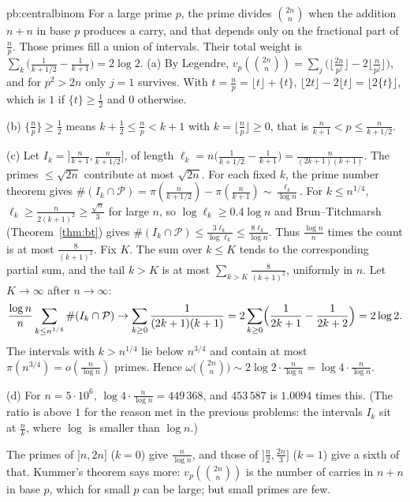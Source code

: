 \begin{solution}{pb:centralbinom}
\idea For a large prime $p$, the prime divides $\binom{2n}n$ when the addition $n+n$ in base $p$ produces a carry, and that depends only on the fractional part of $\frac np$. Those primes fill a union of intervals. Their total weight is $\sum_k\bigl(\frac1{k+1/2}-\frac1{k+1}\bigr)=2\log2$.
\writeup (a) By Legendre, $v_p(\binom{2n}n)=\sum_j\bigl(\lfloor\frac{2n}{p^j}\rfloor-2\lfloor\frac n{p^j}\rfloor\bigr)$, and for $p^2>2n$ only $j=1$ survives. With $t=\frac np=\lfloor t\rfloor+\{t\}$,
$\lfloor2t\rfloor-2\lfloor t\rfloor=\lfloor2\{t\}\rfloor$, which is $1$ if $\{t\}\ge\frac12$ and $0$ otherwise.

(b) $\{\frac np\}\ge\frac12$ means $k+\frac12\le\frac np<k+1$ with $k=\lfloor\frac np\rfloor\ge0$, that is $\frac n{k+1}<p\le\frac n{k+1/2}$.

(c) Let $I_k=\bigl]\frac n{k+1},\frac n{k+1/2}\bigr]$, of length $\ell_k=n\bigl(\frac1{k+1/2}-\frac1{k+1}\bigr)=\frac n{(2k+1)(k+1)}$. The primes $\le\sqrt{2n}$ contribute at most $\sqrt{2n}$.
For each fixed $k$, the prime number theorem gives $\#(I_k\cap\mathcal P)=\pi(\frac n{k+1/2})-\pi(\frac n{k+1})\sim\frac{\ell_k}{\log n}$. For $k\le n^{1/4}$, $\ell_k\ge\frac n{2(k+1)^2}\ge\frac{\sqrt n}3$
for large $n$, so $\log\ell_k\ge0.4\log n$ and Brun--Titchmarsh (Theorem~\ref{thm:bt}) gives $\#(I_k\cap\mathcal P)\le\frac{3\ell_k}{\log\ell_k}\le\frac{8\ell_k}{\log n}$. Thus $\frac{\log n}n$ times the count is at most $\frac8{(k+1)^2}$. Fix $K$. The sum over $k\le K$ tends to the corresponding partial sum, and the tail $k>K$ is at most $\sum_{k>K}\frac8{(k+1)^2}$, uniformly in $n$. Let $K\to\infty$ after $n\to\infty$:
\[
\frac{\log n}n\sum_{k\le n^{1/4}}\#(I_k\cap\mathcal P)\to\sum_{k\ge0}\frac1{(2k+1)(k+1)}=2\sum_{k\ge0}\Bigl(\frac1{2k+1}-\frac1{2k+2}\Bigr)=2\log2.
\]
The intervals with $k>n^{1/4}$ lie below $n^{3/4}$ and contain at most $\pi(n^{3/4})=o(\frac n{\log n})$ primes. Hence $\omega\bigl(\binom{2n}n\bigr)\sim2\log2\cdot\frac n{\log n}=\log4\cdot\frac n{\log n}$.

(d) For $n=5\cdot10^6$, $\log4\cdot\frac n{\log n}=449\,368$, and $453\,587$ is $1.0094$ times this. (The ratio is above $1$ for the reason met in the previous problems: the
intervals $I_k$ sit at $\frac nk$, where $\log$ is smaller than $\log n$.)

\leads The primes of $]n,2n]$ ($k=0$) give $\frac n{\log n}$, and those of $]\frac n2,\frac{2n}3]$ ($k=1$) give a sixth of that. Kummer's theorem says more: $v_p(\binom{2n}n)$ is the number of carries in $n+n$ in base $p$,
which for small $p$ can be large; but small primes are few.
\end{solution}

